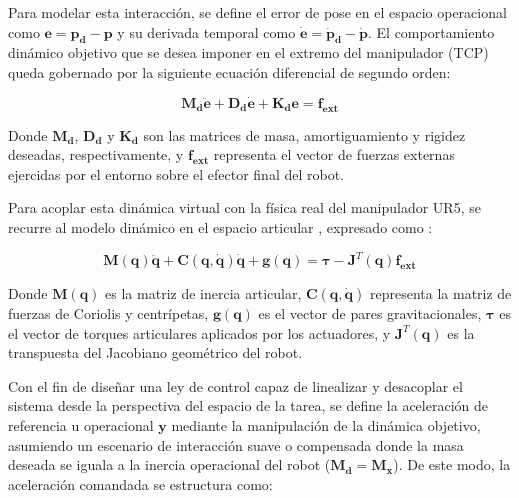 Para modelar esta interacción, se define el error de pose en el espacio
operacional como $\boldsymbol{e} = \boldsymbol{p_d} - \boldsymbol{p}$ y su
derivada temporal como $\boldsymbol{\dot{e}} = \boldsymbol{\dot{p}_d} -
    \boldsymbol{\dot{p}}$. El comportamiento dinámico objetivo que se desea imponer
en el extremo del manipulador (TCP) queda gobernado por la siguiente ecuación
diferencial de segundo orden:

\begin{equation}
    \boldsymbol{M_d} \boldsymbol{\ddot{e}} + \boldsymbol{D_d} \boldsymbol{\dot{e}} + \boldsymbol{K_d} \boldsymbol{e} = \boldsymbol{f_{ext}}
\end{equation}

Donde $\boldsymbol{M_d}$, $\boldsymbol{D_d}$ y $\boldsymbol{K_d}$ son las matrices de masa, amortiguamiento y rigidez
deseadas, respectivamente, y $\boldsymbol{f_{ext}}$ representa el vector de fuerzas externas
ejercidas por el entorno sobre el efector final del robot.

Para acoplar esta dinámica virtual con la física real del manipulador UR5, se
recurre al modelo dinámico en el espacio articular
\cite{siciliano_robotics_2009}, expresado como :

\begin{equation}
    \boldsymbol{M}(\boldsymbol{q})\boldsymbol{\ddot{q}} + \boldsymbol{C}(\boldsymbol{q}, \boldsymbol{\dot{q}})\boldsymbol{\dot{q}} + \boldsymbol{g}(\boldsymbol{q}) = \boldsymbol{\tau} - \boldsymbol{J}^T(\boldsymbol{q}) \boldsymbol{f_{ext}}
\end{equation}

Donde $\boldsymbol{M}(\boldsymbol{q})$ es la matriz de inercia articular, $\boldsymbol{C}(\boldsymbol{q}, \boldsymbol{\dot{q}})$ representa la
matriz de fuerzas de Coriolis y centrípetas, $\boldsymbol{g}(\boldsymbol{q})$ es el vector de pares
gravitacionales, $\boldsymbol{\tau}$ es el vector de torques articulares aplicados por los
actuadores, y $\boldsymbol{J}^T(\boldsymbol{q})$ es la transpuesta del Jacobiano geométrico del robot.

Con el fin de diseñar una ley de control capaz de linealizar y desacoplar el
sistema desde la perspectiva del espacio de la tarea, se define la aceleración
de referencia u operacional $\boldsymbol{y}$ mediante la manipulación de la dinámica
objetivo, asumiendo un escenario de interacción suave o compensada donde la
masa deseada se iguala a la inercia operacional del robot ($\boldsymbol{M_d} = \boldsymbol{M_x}$). De
este modo, la aceleración comandada se estructura como:

